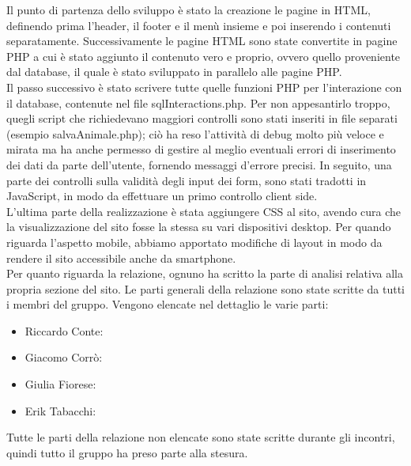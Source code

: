 Il punto di partenza dello sviluppo è stato la creazione le pagine in HTML, definendo prima l'header, il footer e il menù insieme e poi inserendo i contenuti separatamente. Successivamente le pagine HTML sono state convertite in pagine PHP a cui è stato aggiunto il contenuto vero e proprio, ovvero quello proveniente dal database, il quale è stato sviluppato in parallelo alle pagine PHP. \\
Il passo successivo è stato scrivere tutte quelle funzioni PHP per l'interazione con il database, contenute nel file sqlInteractions.php. Per non appesantirlo troppo, quegli script che richiedevano maggiori controlli sono stati inseriti in file separati (esempio salvaAnimale.php); ciò ha reso l'attività di debug molto più veloce e mirata ma ha anche permesso di gestire al meglio eventuali errori di inserimento dei dati da parte dell'utente, fornendo messaggi d'errore precisi.
In seguito, una parte dei controlli sulla validità degli input dei form, sono stati tradotti in JavaScript, in modo da effettuare un primo controllo client side.\\
L'ultima parte della realizzazione è stata aggiungere CSS al sito, avendo cura che la visualizzazione del sito fosse la stessa su vari dispositivi desktop. Per quando riguarda l'aspetto mobile, abbiamo apportato modifiche di layout in modo da rendere il sito accessibile anche da smartphone.\\
Per quanto riguarda la relazione, ognuno ha scritto la parte di analisi relativa alla propria sezione del sito. Le parti generali della relazione sono state scritte da tutti i membri del gruppo.
Vengono elencate nel dettaglio le varie parti:
\begin{itemize}
    \item Riccardo Conte: 
    \item Giacomo Corrò: 
    \item Giulia Fiorese: 
    \item Erik Tabacchi:
\end{itemize}
Tutte le parti della relazione non elencate sono state scritte durante gli incontri, quindi tutto il gruppo ha preso parte alla stesura.
\pagebreak

